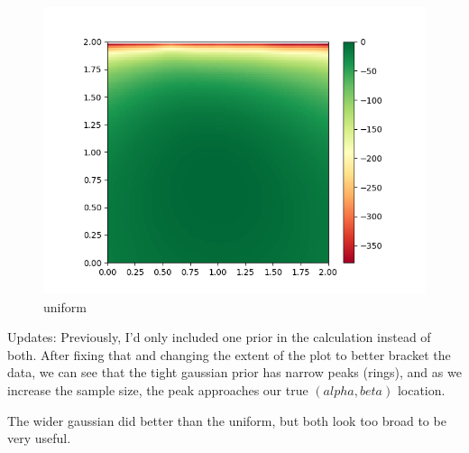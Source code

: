 \documentclass[english]{scrartcl}
\begin{document}
\begin{figure}[H]
	\includegraphics[width=\linewidth]{lighthouse/2d/unif_n=256}
	\caption{uniform} 
	\endminipage \hfill
\end{figure}


\par Updates: Previously, I'd only included one prior in the calculation instead of both. After fixing that and changing the extent of the plot to better bracket the data, we can see that the tight gaussian prior has narrow peaks (rings), and as we increase the sample size, the peak approaches our true $(alpha,beta)$ location.
\par The wider gaussian did better than the uniform, but both look too broad to be very useful.
\end{document}
